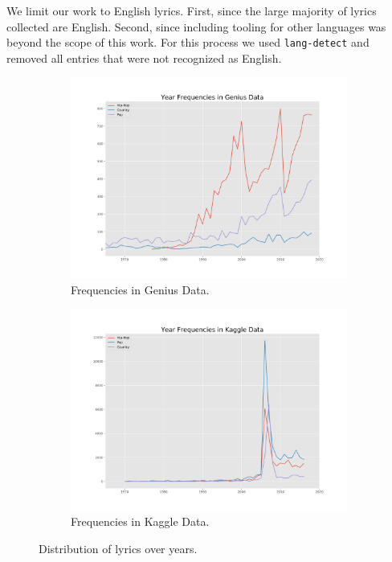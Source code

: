\documentclass[11pt,a4paper]{article}
\begin{document}
We limit our work to English lyrics. First, since the large majority of lyrics collected are English. Second, since including tooling for other languages was beyond the scope of this work. For this process we used \texttt{lang-detect} \citep{danilak_lang_2017} and removed all entries that were not recognized as English.
\begin{figure}[t!]
\centering
\begin{subfigure}[t]{0.49\textwidth}
\centering
\includegraphics[width=\textwidth]{genius_histogram_line}
\caption{Frequencies in Genius Data.}
\label{fig:histograms:genius}
\end{subfigure}
\begin{subfigure}[t]{0.49\textwidth}
\centering
\includegraphics[width=\textwidth]{kaggle_histogram_line}
\caption{Frequencies in Kaggle Data.}
\label{fig:histograms:kaggle}
\end{subfigure}
\caption{Distribution of lyrics over years.}
\label{fig:histograms}
\end{figure}
\end{document}
